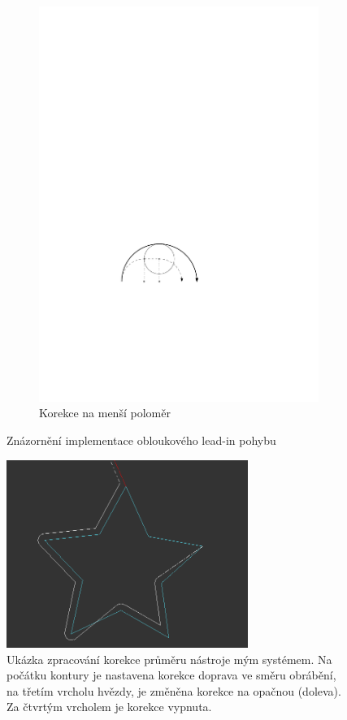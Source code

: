 \begin{figure}[h!]
\begin{subfigure}[b]{0.40\textwidth}
						\includegraphics[width=\textwidth]{img/korekce-leadin5.pdf}
						\caption{Korekce na menší poloměr}
					\end{subfigure}
				\caption{Znázornění implementace obloukového lead-in pohybu}\label{nak:leadinobl}
			\end{figure}
			
		\begin{figure}[h!]
			\centering
			\includegraphics[width=0.7\textwidth]{img/korekce.png}
			\caption{Ukázka zpracování korekce průměru nástroje mým systémem. Na počátku kontury je nastavena korekce doprava ve směru obrábění, na třetím vrcholu hvězdy, je změněna korekce na opačnou (doleva).  Za čtvrtým vrcholem je korekce vypnuta.}\label{nak:korvys}	
		\end{figure}
			
